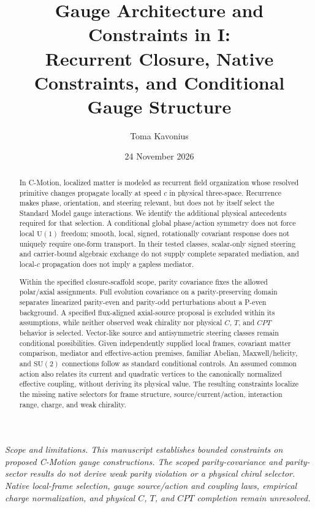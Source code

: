 \documentclass[11pt]{article}
\title{\textbf{Gauge Architecture and Constraints in \cmotion{} I:}\\
Recurrent Closure, Native Constraints, and Conditional Gauge Structure}
\author{Toma Kavonius}
\date{24 November 2026}
\theoremstyle{definition}
\newcommand{\cmotion}{\mbox{C-Motion}}
\newcommand{\Uone}{\mathrm{U}(1)}
\newcommand{\SUtwo}{\mathrm{SU}(2)}
\begin{document}
\maketitle

\begin{center}
\small\itshape
Scope and limitations.  This manuscript establishes bounded constraints on proposed
C-Motion gauge constructions.  The scoped parity-covariance and parity-sector
results do not derive weak parity violation or a physical chiral selector.
Native local-frame selection, gauge source/action and coupling laws, empirical
charge normalization, and physical $C$, $T$, and $CPT$ completion remain unresolved.
\end{center}
\vspace{0.6em}

\begin{abstract}
In \cmotion{}, localized matter is modeled as recurrent field organization
whose resolved primitive changes propagate locally at speed $c$ in physical
three-space.  Recurrence makes phase, orientation, and steering relevant, but
does not by itself select the Standard Model gauge interactions.  We identify
the additional physical antecedents required for that selection.  A conditional
global phase/action symmetry does not force local $\Uone$ freedom; smooth,
local, signed, rotationally covariant response does not uniquely require
one-form transport.  In their tested classes, scalar-only signed steering and
carrier-bound algebraic exchange do not supply complete separated mediation,
and local-$c$ propagation does not imply a gapless mediator.

Within the specified closure-scaffold scope, parity covariance fixes the
allowed polar/axial assignments.  Full evolution covariance on a
parity-preserving domain separates linearized parity-even and parity-odd
perturbations about a P-even background.  A specified flux-aligned axial-source proposal is
excluded within its assumptions, while neither observed weak chirality nor
physical $C$, $T$, and $CPT$ behavior is selected.  Vector-like source and
antisymmetric steering classes remain conditional possibilities.  Given
independently supplied local frames, covariant matter comparison, mediator
and effective-action premises, familiar Abelian, Maxwell/helicity, and
$\SUtwo$ connections follow as standard conditional controls.  An assumed
common action also relates its current and quadratic vertices to the
canonically normalized effective coupling, without deriving its physical
value.  The resulting constraints localize the missing native selectors for
frame structure, source/current/action, interaction range, charge, and weak
chirality.
\end{abstract}
\end{document}
